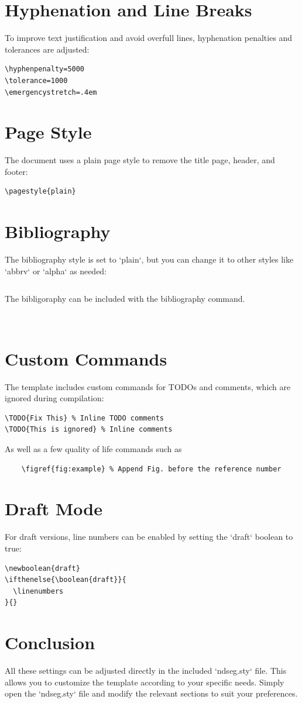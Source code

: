 \documentclass{article}
\begin{document}
\section{Hyphenation and Line Breaks}
To improve text justification and avoid overfull lines, hyphenation penalties and tolerances are adjusted:
\begin{verbatim}
\hyphenpenalty=5000
\tolerance=1000
\emergencystretch=.4em
\end{verbatim}

\section{Page Style}
The document uses a plain page style to remove the title page, header, and footer:
\begin{verbatim}
\pagestyle{plain}
\end{verbatim}

\section{Bibliography}
The bibliography style is set to `plain`, but you can change it to other styles like `abbrv` or `alpha` as needed:
\begin{verbatim}

\end{verbatim}

The bibligoraphy can be included with the bibliography command.
\begin{verbatim}
    
\end{verbatim}

\section{Custom Commands}
The template includes custom commands for TODOs and comments, which are ignored during compilation:
\begin{verbatim}
\TODO{Fix This} % Inline TODO comments
\TODO{This is ignored} % Inline comments
\end{verbatim}

As well as a few quality of life commands such as
\begin{verbatim}
    \figref{fig:example} % Append Fig. before the reference number
\end{verbatim}

\section{Draft Mode}
For draft versions, line numbers can be enabled by setting the `draft` boolean to true:
\begin{verbatim}
\newboolean{draft}
\ifthenelse{\boolean{draft}}{
  \linenumbers
}{}
\end{verbatim}



\section{Conclusion}
All these settings can be adjusted directly in the included `ndseg.sty` file. This allows you to customize the template according to your specific needs. Simply open the `ndseg.sty` file and modify the relevant sections to suit your preferences.
\end{document}
